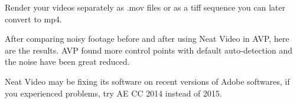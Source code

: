 \begin{fullwidth}

Render your videos separately as .mov files or as a tiff sequence you can later convert to mp4. 

After comparing noisy footage before and after using Neat Video in AVP, here are the results. AVP found more control points with default auto-detection and the noise have been great reduced.



\tip Neat Video may be fixing its software on recent versions of Adobe softwares, if you experienced problems, try AE CC 2014 instead of 2015.

\clearpage
\end{fullwidth}